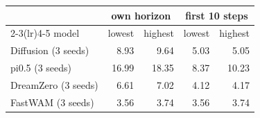 \begin{tabular}{lrrrr}
\toprule
& \multicolumn{2}{c}{own horizon} & \multicolumn{2}{c}{first 10 steps} \\
\cmidrule(lr){2-3}\cmidrule(lr){4-5}
model & lowest & highest & lowest & highest \\
\midrule
Diffusion (3 seeds) & 8.93 & 9.64 & 5.03 & 5.05 \\
pi0.5 (3 seeds) & 16.99 & 18.35 & 8.37 & 10.23 \\
DreamZero (3 seeds) & 6.61 & 7.02 & 4.12 & 4.17 \\
FastWAM (3 seeds) & 3.56 & 3.74 & 3.56 & 3.74 \\
\bottomrule
\end{tabular}
